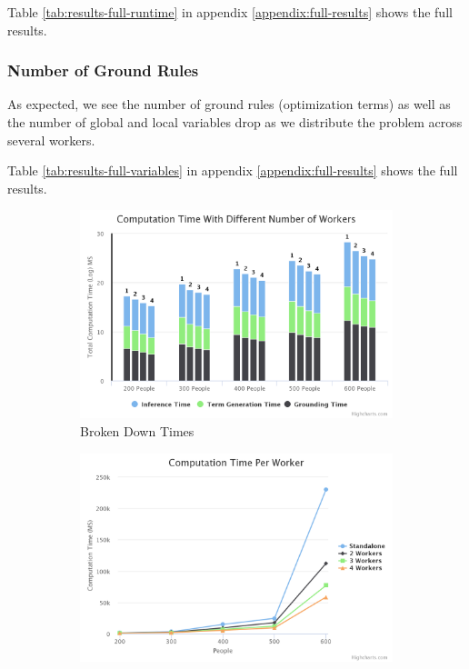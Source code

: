 \documentclass{article}
\begin{document}
            Table \ref{tab:results-full-runtime} in appendix \ref{appendix:full-results} shows the full results.
        
        \subsubsection{Number of Ground Rules}
            
            As expected, we see the number of ground rules (optimization terms) as well as the number of global and local variables drop as we distribute the problem across several workers.
            
            Table \ref{tab:results-full-variables} in appendix \ref{appendix:full-results} shows the full results.
            
            \begin{figure}
                \begin{subfigure}{0.50\textwidth}
                    \includegraphics[width=\textwidth]{images/computationTimeTotal.png}
                    \caption{Broken Down Times}
                    \label{fig:distributed-results-computation-time-total}
                \end{subfigure}
                \begin{subfigure}{0.50\textwidth}
                    \includegraphics[width=\textwidth]{images/computationTimePerWorker.png}

\end{subfigure}
\end{figure}
\end{document}
